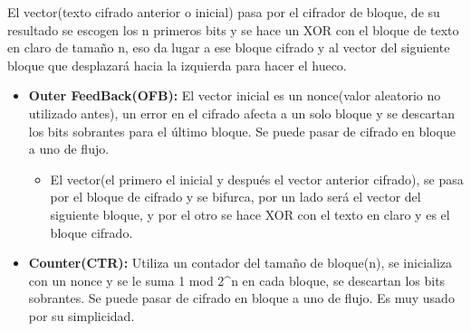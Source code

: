 \documentclass[12pt, twoside, openright]{report} %
\begin{document}
  El vector(texto cifrado anterior o inicial) pasa por el cifrador de
  bloque, de su resultado se escogen los n primeros bits y se hace un
  XOR con el bloque de texto en claro de tamaño n, eso da lugar a ese
  bloque cifrado y al vector del siguiente bloque que desplazará hacia
  la izquierda para hacer el hueco.

  \begin{itemize}
  \item \textbf{Outer FeedBack(OFB):} El vector inicial es un nonce(valor
    aleatorio no utilizado antes), un error en el cifrado afecta a un
    solo bloque y se descartan los bits sobrantes para el último bloque.
    Se puede pasar de cifrado en bloque a uno de flujo.
    

    \begin{itemize}
    \item El vector(el primero el inicial y después el vector anterior
      cifrado), se pasa por el bloque de cifrado y se bifurca, por un
      lado será el vector del siguiente bloque, y por el otro se hace
      XOR con el texto en claro y es el bloque cifrado.
      
    \end{itemize}
  \item \textbf{Counter(CTR):} Utiliza un contador del tamaño de bloque(n),
    se inicializa con un nonce y se le suma 1 mod 2\^{}n en cada bloque,
    se descartan los bits sobrantes. Se puede pasar de cifrado en bloque
    a uno de flujo. Es muy usado por su simplicidad.
    
  \end{itemize}
\end{document}
